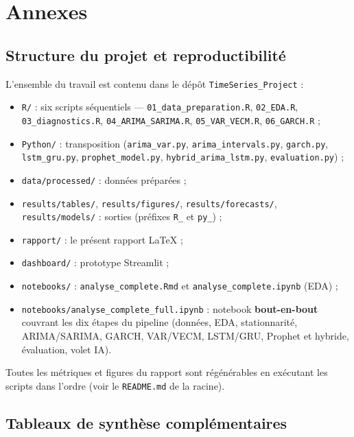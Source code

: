 \section{Annexes}

\subsection{Structure du projet et reproductibilité}
L'ensemble du travail est contenu dans le dépôt
\texttt{TimeSeries\_Project} :
\begin{itemize}
  \item \texttt{R/} : six scripts séquentiels ---
        \texttt{01\_data\_preparation.R}, \texttt{02\_EDA.R},
        \texttt{03\_diagnostics.R}, \texttt{04\_ARIMA\_SARIMA.R},
        \texttt{05\_VAR\_VECM.R}, \texttt{06\_GARCH.R} ;
  \item \texttt{Python/} : transposition
        (\texttt{arima\_var.py}, \texttt{arima\_intervals.py},
        \texttt{garch.py}, \texttt{lstm\_gru.py},
        \texttt{prophet\_model.py}, \texttt{hybrid\_arima\_lstm.py},
        \texttt{evaluation.py}) ;
  \item \texttt{data/processed/} : données préparées ;
  \item \texttt{results/tables/}, \texttt{results/figures/},
        \texttt{results/forecasts/}, \texttt{results/models/} : sorties
        (préfixes \texttt{R\_} et \texttt{py\_}) ;
  \item \texttt{rapport/} : le présent rapport \LaTeX{} ;
  \item \texttt{dashboard/} : prototype Streamlit ;
  \item \texttt{notebooks/} : \texttt{analyse\_complete.Rmd} et
        \texttt{analyse\_complete.ipynb} (EDA) ;
  \item \texttt{notebooks/analyse\_complete\_full.ipynb} : notebook
        \textbf{bout-en-bout} couvrant les dix étapes du pipeline (données,
        EDA, stationnarité, ARIMA/SARIMA, GARCH, VAR/VECM, LSTM/GRU, Prophet
        et hybride, évaluation, volet IA).
\end{itemize}
Toutes les métriques et figures du rapport sont régénérables en exécutant les
scripts dans l'ordre (voir le \texttt{README.md} de la racine).

\subsection{Tableaux de synthèse complémentaires}

